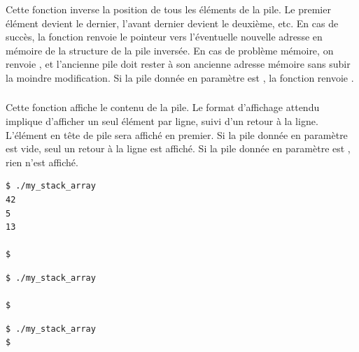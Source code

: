 \subsubsection*{}

\noindent Cette fonction inverse la position de tous les éléments de la pile.
Le premier élément devient le dernier, l'avant dernier devient le deuxième, etc.
En cas de succès, la fonction renvoie le pointeur vers l'éventuelle nouvelle adresse en mémoire de la structure de la pile inversée.
En cas de problème mémoire, on renvoie , et l'ancienne pile doit rester à son ancienne adresse mémoire sans subir la moindre modification.
Si la pile donnée en paramètre est , la fonction renvoie .


\subsubsection*{}

\noindent Cette fonction affiche le contenu de la pile.
Le format d'affichage attendu implique d'afficher un seul élément par ligne, suivi d'un retour à la ligne.
L'élément en tête de pile sera affiché en premier.
Si la pile donnée en paramètre est vide, seul un retour à la ligne est affiché.
Si la pile donnée en paramètre est , rien n'est affiché.


\vfillFirst

\lstset{language=sh}
\begin{lstlisting}[frame=single,title={Exemple d'affichage du cas normal : pile contenant 42, 5, 13}]
$ ./my_stack_array
42
5
13

$
\end{lstlisting}

\vfillLast

\newpage

\lstset{language=sh}
\begin{lstlisting}[frame=single,title={Exemple d'affichage d'une pile vide}]
$ ./my_stack_array

$
\end{lstlisting}

\bigskip

\lstset{language=sh}
\begin{lstlisting}[frame=single,title={Exemple d'affichage d'un pointeur NULL}]
$ ./my_stack_array
$
\end{lstlisting}
